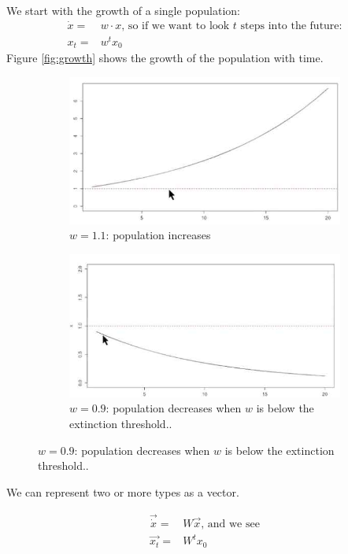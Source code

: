 \documentclass[]{article}
\begin{document}
We start with the growth of a single population:
\begin{align*}
	\dot{x} =& w \cdot x \text{, so if we want to look $t$ steps into the future:}\\
	x_t =& w^t x_0
\end{align*}
Figure \ref{fig:growth} shows the growth of the population with time.
\begin{figure}[H]
	\caption{Growth of $x$}\label{fig:growth}
	\begin{subfigure}[t]{0.45\textwidth}
		\caption{$w=1.1$: population increases}\label{fig:growth1}
		\includegraphics[width=\textwidth]{growth1}
	\end{subfigure}
	\begin{subfigure}[t]{0.45\textwidth}
		\caption{$w=0.9$: population decreases when $w$ is below the extinction threshold..}\label{fig:growth2}
		\includegraphics[width=\textwidth]{growth2}
	\end{subfigure}
\end{figure}

We can represent two or more types as a vector.

\begin{align*}
	\vec{\dot{x}} =& W \vec{x} \text{, and we see}\\
	\vec{x_t}=& W^t x_0 
\end{align*}
\end{document}
